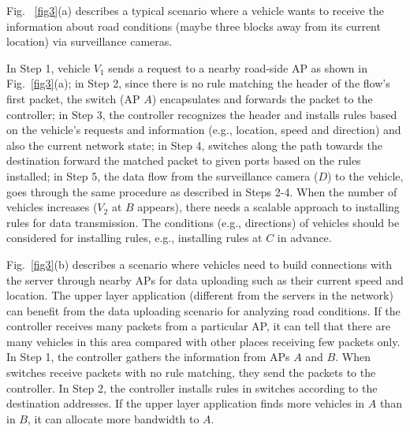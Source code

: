\documentclass[journal]{IEEEtran}
\begin{document}
Fig. ~\ref{fig3}(a) describes a typical scenario where a vehicle wants to receive the information about road conditions (maybe three blocks away from its current location) via surveillance cameras.

In Step 1, vehicle $V_{1}$ sends a request to a nearby road-side AP as shown in Fig.~\ref{fig3}(a); in Step 2, since there is no rule matching the header of the flow's first packet, the switch (AP $A$) encapsulates and forwards the packet to the controller; in Step 3, the controller recognizes the header and installs rules based on the vehicle's requests and information (e.g., location, speed and direction) and also the current network state; in Step 4, switches along the path towards the destination forward the matched packet to given ports based on the rules installed; in Step 5, the data flow from the surveillance camera ($D$) to the vehicle, goes through the same procedure as described in Steps 2-4. When the number of vehicles increases ($V_{2}$ at $B$ appears), there needs a scalable approach to installing rules for data transmission. The conditions (e.g., directions) of vehicles should be considered for installing rules, e.g., installing rules at $C$ in advance.

Fig.~\ref{fig3}(b) describes a scenario where vehicles need to build connections with the server through nearby APs for data uploading such as their current speed and location. The upper layer application (different from the servers in the network) can benefit from the data uploading scenario for analyzing road conditions. If the controller receives many packets from a particular AP, it can tell that there are many vehicles in this area compared with other places receiving few packets only. In Step 1, the controller gathers the information from APs $A$ and $B$. When switches receive packets with no rule matching, they send the packets to the controller. In Step 2, the controller installs rules in switches according to the destination addresses. If the upper layer application finds more vehicles in $A$ than in $B$, it can allocate more bandwidth to $A$.
\end{document}
